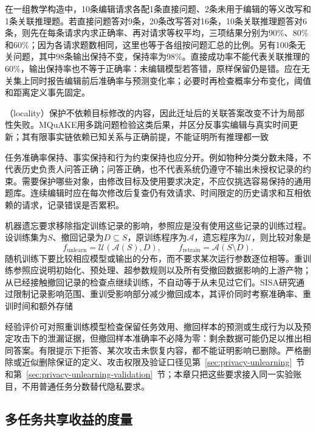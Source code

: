 在一组教学构造中，10条编辑请求各配1条直接问题、2条未用于编辑的等义改写和1条关联推理题。若直接问题答对9条，20条改写答对16条，10条关联推理题答对6条，则先在每条请求内求正确率、再对请求等权平均，三项结果分别为90\%、80\%和60\%；因为各请求题数相同，这里也等于各组按问题汇总的比例。另有100条无关问题，其中98条输出保持不变，保持率为98\%。直接成功率不能代表关联推理的60\%，输出保持率也不等于正确率：未编辑模型若答错，原样保留仍是错。应在无关集上同时报告编辑前后准确率与预测变化率；必要时再检查概率分布变化，阈值和距离定义事先固定。

（locality）保护不依赖目标修改的内容，因此迁址后的关联答案改变不计为局部性失败。MQuAKE用多跳问题检验这类后果，并区分反事实编辑与真实时间更新；其有限事实链依赖已知关系与正确前提，不能证明所有推理都一致

任务准确率保持、事实保持和行为约束保持也应分开。例如物种分类分数未降，不代表历史负责人问答正确；问答正确，也不代表系统仍遵守不输出未授权记录的约束。需要保护哪些对象，由修改目标及使用要求决定，不应仅挑选容易保持的通用题库。连续编辑时应在每次修改后复查仍有效请求、时间限定的历史请求和互相依赖的请求，记录错误是否累积。

机器遗忘要求移除指定训练记录的影响，参照应是没有使用这些记录的训练过程。设训练集为$S$、撤回记录为$D\subseteq S$，原训练程序为$\mathcal A$，遗忘程序为$\mathcal U$，则比较对象是
\begin{equation}
  f_{\mathrm{unlearn}}=\mathcal U(\mathcal A(S),D),
  \qquad f_{\mathrm{retrain}}=\mathcal A(S\setminus D).
  \label{eq:ket-evaluation-unlearning-reference}
\end{equation}
随机训练下要比较相应模型或输出的分布，而不要求某次运行参数逐位相等。重训练参照应说明初始化、预处理、超参数规则以及所有受撤回数据影响的上游产物；从已经接触撤回记录的检查点继续训练，不自动等于从未见过它们。SISA研究通过限制记录影响范围、重训受影响部分减少撤回成本，其评价同时考察准确率、重训时间和额外存储

经验评价可对照重训练模型检查保留任务效用、撤回样本的预测或生成行为以及预定攻击下的泄漏证据，但撤回样本准确率不必降为零：剩余数据可能仍足以推出相同答案。有限提示下拒答、某次攻击未恢复内容，都不能证明影响已删除。严格删除或近似删除保证的定义、攻击权限及验证口径见第~\ref{sec:privacy-unlearning}~节和第~\ref{sec:privacy-unlearning-validation}~节；本章只把这些要求接入同一实验账目，不用普通任务分数替代隐私要求。

\subsection{多任务共享收益的度量}
\label{sec:ket-evaluation-sharing}

